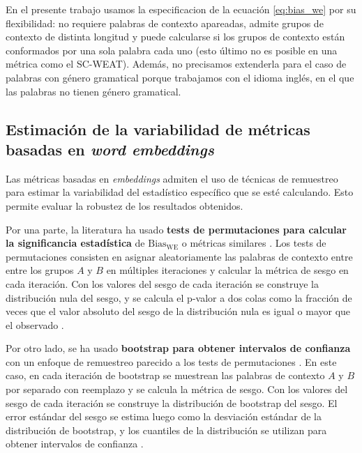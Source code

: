 
En el presente trabajo usamos la especificacion de la ecuación \ref{eq:bias_we} por su flexibilidad: no requiere palabras de contexto apareadas, admite grupos de contexto de distinta longitud y puede calcularse si los grupos de contexto están conformados por una sola palabra cada uno (esto último no es posible en una métrica como el SC-WEAT). Además, no precisamos extenderla para el caso de palabras con género gramatical porque trabajamos con el idioma inglés, en el que las palabras no tienen género gramatical.

\subsection{Estimación de la variabilidad de métricas basadas en \emph{word embeddings}} \label{sec:bias_we_variabilidad}


Las métricas basadas en \emph{embeddings} admiten el uso de técnicas de remuestreo para estimar la variabilidad del estadístico específico que se esté calculando. Esto permite evaluar la robustez de los resultados obtenidos. 


Por una parte, la literatura ha usado \textbf{tests de permutaciones para calcular la significancia estadística} de $\text{Bias}_{\text{WE}}$ o métricas similares \citep{caliskan2017semantics,charlesworth2021gender}. Los tests de permutaciones consisten en asignar aleatoriamente las palabras de contexto entre entre los grupos $A$ y $B$ en múltiples iteraciones y calcular la métrica de sesgo en cada iteración. Con los valores del sesgo de cada iteración se construye la distribución nula del sesgo, y se calcula el p-valor a dos colas como la fracción de veces que el valor absoluto del sesgo de la distribución nula es igual o mayor que el observado \citep{north2002note}.

Por otro lado, se ha usado \textbf{bootstrap para obtener intervalos de confianza} con un enfoque de remuestreo parecido a los tests de permutaciones \citep{garg2018word}. En este caso, en cada iteración de bootstrap se muestrean las palabras de contexto $A$ y $B$ por separado con reemplazo y se calcula la métrica de sesgo. Con los valores del sesgo de cada iteración se construye la distribución de bootstrap del sesgo. El error estándar del sesgo se estima luego como la desviación estándar de la distribución de bootstrap, y los cuantiles de la distribución se utilizan para obtener intervalos de confianza \citep{davison1997bootstrap}.

